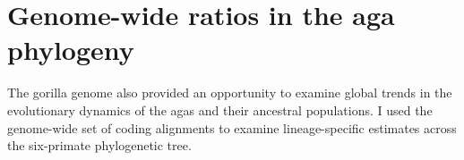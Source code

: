 

\section[Genome-wide \dnds ratios in the \acl{aga} phylogeny]{Genome-wide \dnds ratios in the \acl{aga} phylogeny}

The gorilla genome also provided an opportunity to examine global
trends in the evolutionary dynamics of the \acp{aga} and their
ancestral populations. I used the genome-wide set of coding alignments
to examine lineage-specific \dnds estimates across the six-primate
phylogenetic tree.

